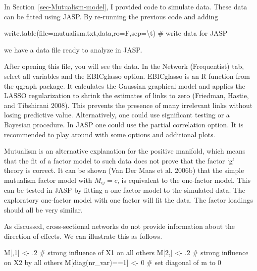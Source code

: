 \documentclass[
  a4paper,
  DIV=11,
  numbers=noendperiod]{scrreprt}
\newenvironment{Shaded}{\begin{snugshade}}{\end{snugshade}}
\newcommand{\AttributeTok}[1]{\textcolor[rgb]{0.40,0.45,0.13}{#1}}
\newcommand{\CommentTok}[1]{\textcolor[rgb]{0.37,0.37,0.37}{#1}}
\newcommand{\DecValTok}[1]{\textcolor[rgb]{0.68,0.00,0.00}{#1}}
\newcommand{\FunctionTok}[1]{\textcolor[rgb]{0.28,0.35,0.67}{#1}}
\newcommand{\NormalTok}[1]{\textcolor[rgb]{0.00,0.23,0.31}{#1}}
\newcommand{\OtherTok}[1]{\textcolor[rgb]{0.00,0.23,0.31}{#1}}
\newcommand{\SpecialCharTok}[1]{\textcolor[rgb]{0.37,0.37,0.37}{#1}}
\newcommand{\StringTok}[1]{\textcolor[rgb]{0.13,0.47,0.30}{#1}}
\begin{document}
In Section~\ref{sec-Mutualism-model}, I provided code to simulate data.
These data can be fitted using JASP. By re-running the previous code and
adding

\begin{Shaded}
\begin{Highlighting}[]
\FunctionTok{write.table}\NormalTok{(}\AttributeTok{file=}\StringTok{\textquotesingle{}mutualism.txt\textquotesingle{}}\NormalTok{,data,}\AttributeTok{ro=}\NormalTok{F,}\AttributeTok{sep=}\StringTok{\textquotesingle{}}\SpecialCharTok{\textbackslash{}t}\StringTok{\textquotesingle{}}\NormalTok{) }\CommentTok{\# write data for JASP}
\end{Highlighting}
\end{Shaded}

we have a data file ready to analyze in JASP.

After opening this file, you will see the data. In the Network
(Frequentist) tab, select all variables and the EBICglasso option.
EBICglasso is an R function from the qgraph package. It calculates the
Gaussian graphical model and applies the LASSO regularization to shrink
the estimates of links to zero (Friedman, Hastie, and Tibshirani 2008).
This prevents the presence of many irrelevant links without losing
predictive value. Alternatively, one could use significant testing or a
Bayesian procedure. In JASP one could use the partial correlation
option. It is recommended to play around with some options and
additional plots.

Mutualism is an alternative explanation for the positive manifold, which
means that the fit of a factor model to such data does not prove that
the factor `g' theory is correct. It can be shown (Van Der Maas et al.
2006b) that the simple mutualism factor model with \(M_{ij} = c\), is
equivalent to the one-factor model. This can be tested in JASP by
fitting a one-factor model to the simulated data. The exploratory
one-factor model with one factor will fit the data. The factor loadings
should all be very similar.

As discussed, cross-sectional networks do not provide information about
the direction of effects. We can illustrate this as follows.

\begin{Shaded}
\begin{Highlighting}[]
\NormalTok{M[,}\DecValTok{1}\NormalTok{] }\OtherTok{\textless{}{-}}\NormalTok{ .}\DecValTok{2} \CommentTok{\# strong influence of X1 on all others}
\NormalTok{M[}\DecValTok{2}\NormalTok{,] }\OtherTok{\textless{}{-}}\NormalTok{ .}\DecValTok{2} \CommentTok{\# strong influence on X2 by all others}
\NormalTok{M[}\FunctionTok{diag}\NormalTok{(nr\_var)}\SpecialCharTok{==}\DecValTok{1}\NormalTok{] }\OtherTok{\textless{}{-}} \DecValTok{0} \CommentTok{\# set diagonal of m to 0}
\end{Highlighting}
\end{Shaded}
\end{document}
